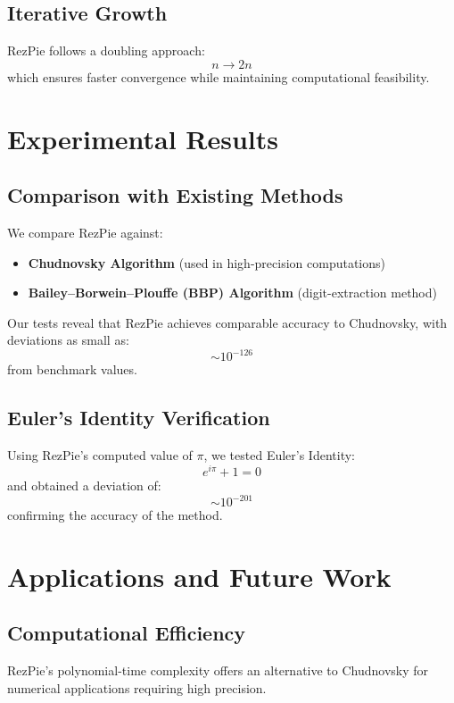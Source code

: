 \documentclass{article}
\begin{document}
\subsection{Iterative Growth}
RezPie follows a doubling approach:
\begin{equation}
n \rightarrow 2n
\end{equation}
which ensures faster convergence while maintaining computational feasibility.

\section{Experimental Results}
\subsection{Comparison with Existing Methods}
We compare RezPie against:
\begin{itemize}
    \item \textbf{Chudnovsky Algorithm} (used in high-precision computations)
    \item \textbf{Bailey–Borwein–Plouffe (BBP) Algorithm} (digit-extraction method)
\end{itemize}
Our tests reveal that RezPie achieves comparable accuracy to Chudnovsky, with deviations as small as:
\begin{equation}
\sim 10^{-126}
\end{equation}
from benchmark values.

\subsection{Euler’s Identity Verification}
Using RezPie’s computed value of $\pi$, we tested Euler’s Identity:
\begin{equation}
e^{i\pi} + 1 = 0
\end{equation}
and obtained a deviation of:
\begin{equation}
\sim 10^{-201}
\end{equation}
confirming the accuracy of the method.

\section{Applications and Future Work}
\subsection{Computational Efficiency}
RezPie’s polynomial-time complexity offers an alternative to Chudnovsky for numerical applications requiring high precision.
\end{document}
